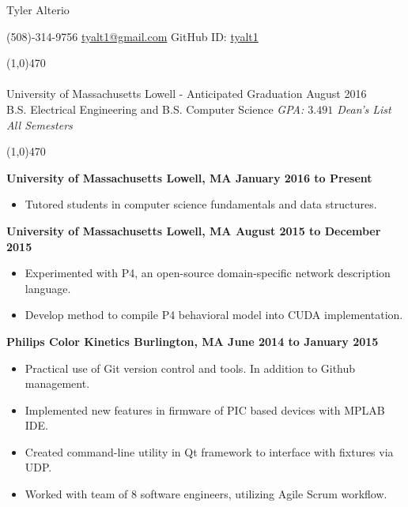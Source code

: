 \documentclass[11pt, a4paper]{article} %
\newcommand{\tinybullet}{ {\tiny \textbullet} }
\begin{document}
\centerline{\Huge \sc Tyler Alterio}

\centerline{
(508)-314-9756 \tinybullet \hspace{1pt}
\href{mailto:tyalt1@gmail.com}{tyalt1@gmail.com} \tinybullet \hspace{1pt}
GitHub ID: \href{http://www.github.com/tyalt1}{tyalt1}
}

\noindent \line(1,0){470}\\

\smallskip \\
University of Massachusetts Lowell - Anticipated Graduation August 2016 \\
B.S. Electrical Engineering and B.S. Computer Science
\hfill {\it GPA: $3.491$ \tinybullet \hspace{1pt} Dean's List All Semesters}

\noindent \line(1,0){470}\\



\centerline{\bf University of Massachusetts \tinybullet \hspace{1pt} Lowell, MA \hfill January 2016 to Present}
\begin{itemize}
\itemsep0em
	\item Tutored students in computer science fundamentals and data structures.
\end{itemize}

\centerline{\bf University of Massachusetts \tinybullet \hspace{1pt} Lowell, MA \hfill August 2015 to December 2015}
\begin{itemize}
\itemsep0em
	\item Experimented with P4, an open-source domain-specific network description language.
	\item Develop method to compile P4 behavioral model into CUDA implementation.
\end{itemize}

\centerline{\bf Philips Color Kinetics \tinybullet \hspace{1pt} Burlington, MA \hfill June 2014 to January 2015}
\begin{itemize}
\itemsep0em
	\item Practical use of Git version control and tools. In addition to Github management.
	\item Implemented new features in firmware of PIC based devices with MPLAB IDE.
	\item Created command-line utility in Qt framework to interface with fixtures via UDP.
	\item Worked with team of 8 software engineers, utilizing Agile Scrum workflow.
\end{itemize}
\end{document}
